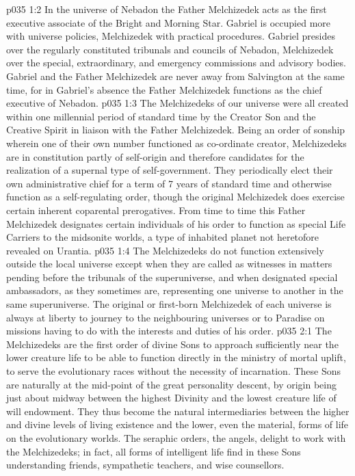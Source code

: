 \vs p035 1:2 In the universe of Nebadon the Father Melchizedek acts as the first executive associate of the Bright and Morning Star. Gabriel is occupied more with universe policies, Melchizedek with practical procedures. Gabriel presides over the regularly constituted tribunals and councils of Nebadon, Melchizedek over the special, extraordinary, and emergency commissions and advisory bodies. Gabriel and the Father Melchizedek are never away from Salvington at the same time, for in Gabriel’s absence the Father Melchizedek functions as the chief executive of Nebadon.
\vs p035 1:3 The Melchizedeks of our universe were all created within one millennial period of standard time by the Creator Son and the Creative Spirit in liaison with the Father Melchizedek. Being an order of sonship wherein one of their own number functioned as co\hyp{}ordinate creator, Melchizedeks are in constitution partly of self\hyp{}origin and therefore candidates for the realization of a supernal type of self\hyp{}government. They periodically elect their own administrative chief for a term of 7 years of standard time and otherwise function as a self\hyp{}regulating order, though the original Melchizedek does exercise certain inherent coparental prerogatives. From time to time this Father Melchizedek designates certain individuals of his order to function as special Life Carriers to the midsonite worlds, a type of inhabited planet not heretofore revealed on Urantia.
\vs p035 1:4 The Melchizedeks do not function extensively outside the local universe except when they are called as witnesses in matters pending before the tribunals of the superuniverse, and when designated special ambassadors, as they sometimes are, representing one universe to another in the same superuniverse. The original or first\hyp{}born Melchizedek of each universe is always at liberty to journey to the neighbouring universes or to Paradise on missions having to do with the interests and duties of his order.
\vs p035 2:1 The Melchizedeks are the first order of divine Sons to approach sufficiently near the lower creature life to be able to function directly in the ministry of mortal uplift, to serve the evolutionary races without the necessity of incarnation. These Sons are naturally at the mid\hyp{}point of the great personality descent, by origin being just about midway between the highest Divinity and the lowest creature life of will endowment. They thus become the natural intermediaries between the higher and divine levels of living existence and the lower, even the material, forms of life on the evolutionary worlds. The seraphic orders, the angels, delight to work with the Melchizedeks; in fact, all forms of intelligent life find in these Sons understanding friends, sympathetic teachers, and wise counsellors.
